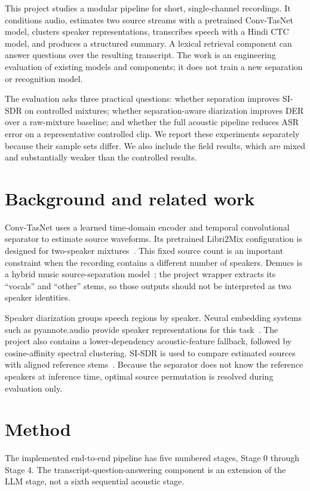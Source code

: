 \documentclass[11pt,a4paper,twocolumn]{article}
\begin{document}
This project studies a modular pipeline for short, single-channel recordings. It conditions audio, estimates two source streams with a pretrained Conv-TasNet model, clusters speaker representations, transcribes speech with a Hindi CTC model, and produces a structured summary. A lexical retrieval component can answer questions over the resulting transcript. The work is an engineering evaluation of existing models and components; it does not train a new separation or recognition model.

The evaluation asks three practical questions: whether separation improves SI-SDR on controlled mixtures; whether separation-aware diarization improves DER over a raw-mixture baseline; and whether the full acoustic pipeline reduces ASR error on a representative controlled clip. We report these experiments separately because their sample sets differ. We also include the field results, which are mixed and substantially weaker than the controlled results.

\section{Background and related work}
Conv-TasNet uses a learned time-domain encoder and temporal convolutional separator to estimate source waveforms. Its pretrained Libri2Mix configuration is designed for two-speaker mixtures~\cite{luo2019convtasnet}. This fixed source count is an important constraint when the recording contains a different number of speakers. Demucs is a hybrid music source-separation model~\cite{defossez2021demucs}; the project wrapper extracts its ``vocals'' and ``other'' stems, so those outputs should not be interpreted as two speaker identities.

Speaker diarization groups speech regions by speaker. Neural embedding systems such as pyannote.audio provide speaker representations for this task~\cite{bredin2020pyannote}. The project also contains a lower-dependency acoustic-feature fallback, followed by cosine-affinity spectral clustering. SI-SDR is used to compare estimated sources with aligned reference stems~\cite{vincent2006performance}. Because the separator does not know the reference speakers at inference time, optimal source permutation is resolved during evaluation only.

\section{Method}
The implemented end-to-end pipeline has five numbered stages, Stage 0 through Stage 4. The transcript-question-answering component is an extension of the LLM stage, not a sixth sequential acoustic stage.
\end{document}
